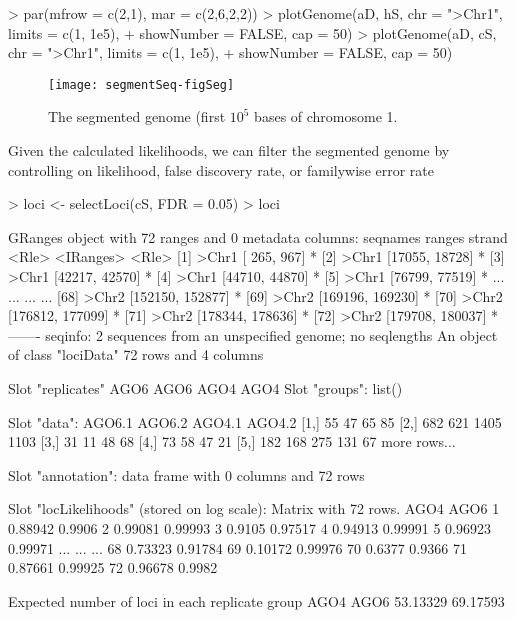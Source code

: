 \documentclass[a4paper]{article}
\begin{document}
\begin{Schunk}
\begin{Sinput}
> par(mfrow = c(2,1), mar = c(2,6,2,2))
> plotGenome(aD, hS, chr = ">Chr1", limits = c(1, 1e5),
+            showNumber = FALSE, cap = 50)
> plotGenome(aD, cS, chr = ">Chr1", limits = c(1, 1e5),
+            showNumber = FALSE, cap = 50)
\end{Sinput}
\end{Schunk}

\begin{figure}[!ht]
\begin{center}

\texttt{[image: segmentSeq-figSeg]}
\caption{The segmented genome (first $10^5$ bases of chromosome 1.}
\label{fig:Seg}
\end{center}
\end{figure}

Given the calculated likelihoods, we can filter the segmented genome by controlling on likelihood, false discovery rate, or familywise error rate

\begin{Schunk}
\begin{Sinput}
> loci <- selectLoci(cS, FDR = 0.05)
> loci
\end{Sinput}
\begin{Soutput}
GRanges object with 72 ranges and 0 metadata columns:
       seqnames           ranges strand
          <Rle>        <IRanges>  <Rle>
   [1]    >Chr1   [  265,   967]      *
   [2]    >Chr1   [17055, 18728]      *
   [3]    >Chr1   [42217, 42570]      *
   [4]    >Chr1   [44710, 44870]      *
   [5]    >Chr1   [76799, 77519]      *
   ...      ...              ...    ...
  [68]    >Chr2 [152150, 152877]      *
  [69]    >Chr2 [169196, 169230]      *
  [70]    >Chr2 [176812, 177099]      *
  [71]    >Chr2 [178344, 178636]      *
  [72]    >Chr2 [179708, 180037]      *
  -------
  seqinfo: 2 sequences from an unspecified genome; no seqlengths
An object of class "lociData"
72 rows and 4 columns

Slot "replicates"
AGO6 AGO6 AGO4 AGO4
Slot "groups":
list()

Slot "data":
     AGO6.1 AGO6.2 AGO4.1 AGO4.2
[1,]     55     47     65     85
[2,]    682    621   1405   1103
[3,]     31     11     48     68
[4,]     73     58     47     21
[5,]    182    168    275    131
67 more rows...

Slot "annotation":
data frame with 0 columns and 72 rows

Slot "locLikelihoods" (stored on log scale):
Matrix with  72  rows.
       AGO4    AGO6
1   0.88942  0.9906
2   0.99081 0.99993
3    0.9105 0.97517
4   0.94913 0.99991
5   0.96923 0.99971
...     ...     ...
68  0.73323 0.91784
69  0.10172 0.99976
70   0.6377  0.9366
71  0.87661 0.99925
72  0.96678  0.9982

Expected number of loci in each replicate group
    AGO4     AGO6 
53.13329 69.17593 
\end{Soutput}
\end{Schunk}
\end{document}
